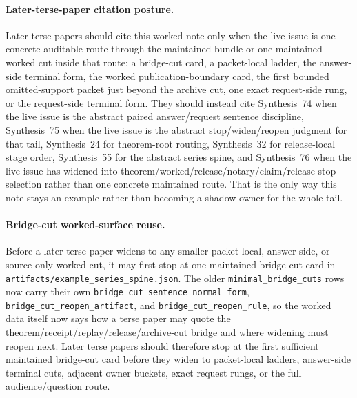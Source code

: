 \documentclass[11pt]{article}
\begin{document}
\paragraph{Later-terse-paper citation posture.}
Later terse papers should cite this worked note only when the live issue is one concrete auditable route through the maintained bundle or one maintained worked cut inside that route: a bridge-cut card, a packet-local ladder, the answer-side terminal form, the worked publication-boundary card, the first bounded omitted-support packet just beyond the archive cut, one exact request-side rung, or the request-side terminal form. They should instead cite Synthesis~74 when the live issue is the abstract paired answer/request sentence discipline, Synthesis~75 when the live issue is the abstract stop/widen/reopen judgment for that tail, Synthesis~24 for theorem-root routing, Synthesis~32 for release-local stage order, Synthesis~55 for the abstract series spine, and Synthesis~76 when the live issue has widened into theorem/worked/release/notary/claim/release stop selection rather than one concrete maintained route. That is the only way this note stays an example rather than becoming a shadow owner for the whole tail.\cite{series:mathcrosswalk,series:releasespine,series:seriesspines,series:pairedterminalcitationdiscipline,series:pairedterminalcutoverrules,series:theoremtopublicationspine}

\paragraph{Bridge-cut worked-surface reuse.}
Before a later terse paper widens to any smaller packet-local, answer-side, or source-only worked cut, it may first stop at one maintained bridge-cut card in \nolinkurl{artifacts/example_series_spine.json}. The older \texttt{minimal\_bridge\_cuts} rows now carry their own \texttt{bridge\_cut\_sentence\_normal\_form}, \texttt{bridge\_cut\_reopen\_artifact}, and \texttt{bridge\_cut\_reopen\_rule}, so the worked data itself now says how a terse paper may quote the theorem/receipt/replay/release/archive-cut bridge and where widening must reopen next. Later terse papers should therefore stop at the first sufficient maintained bridge-cut card before they widen to packet-local ladders, answer-side terminal cuts, adjacent owner buckets, exact request rungs, or the full audience/question route.\cite{series:seriesspines}
\end{document}
